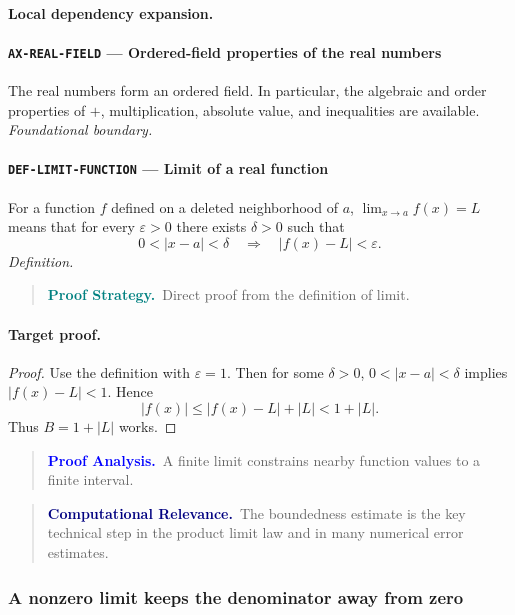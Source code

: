 \documentclass[10pt]{article}
\newcommand{\pidraw}[1]{\begingroup\urlstyle{tt}\nolinkurl{#1}\endgroup}
\theoremstyle{definition}
\theoremstyle{remark}
\newenvironment{proofstrategy}
{\begin{quote}\small\noindent\textbf{\textcolor{teal}{Proof Strategy.}}\ }
{\end{quote}}
\newenvironment{proofanalysis}
{\begin{quote}\small\noindent\textbf{\textcolor{blue}{Proof Analysis.}}\ }
{\end{quote}}
\newenvironment{computationalrelevance}
{\begin{quote}\small\noindent\textbf{\textcolor{navy}{Computational Relevance.}}\ }
{\end{quote}}
\begin{document}
\paragraph{Local dependency expansion.}

\paragraph{\pidraw{AX-REAL-FIELD} --- Ordered-field properties of the real numbers}
The real numbers form an ordered field. In particular, the algebraic and order properties of $+$, multiplication, absolute value, and inequalities are available.
\textit{Foundational boundary.}

\paragraph{\pidraw{DEF-LIMIT-FUNCTION} --- Limit of a real function}
For a function $f$ defined on a deleted neighborhood of $a$, $\lim_{x\to a}f(x)=L$ means that for every $\varepsilon>0$ there exists $\delta>0$ such that
\[
0<|x-a|<\delta\quad\Longrightarrow\quad |f(x)-L|<\varepsilon.
\]
\textit{Definition.}

\begin{proofstrategy}Direct proof from the definition of limit.\end{proofstrategy}

\paragraph{Target proof.}

\begin{proof}

Use the definition with $\varepsilon=1$. Then for some $\delta>0$,
$0<|x-a|<\delta$ implies $|f(x)-L|<1$. Hence
\[
|f(x)|\le |f(x)-L|+|L|<1+|L|.
\]
Thus $B=1+|L|$ works.

\end{proof}

\begin{proofanalysis}A finite limit constrains nearby function values to a finite interval.\end{proofanalysis}

\begin{computationalrelevance}The boundedness estimate is the key technical step in the product limit law and in many numerical error estimates.\end{computationalrelevance}

\subsubsection{A nonzero limit keeps the denominator away from zero}
\end{document}

